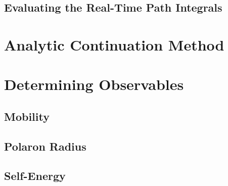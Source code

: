 \subsection{Evaluating the Real-Time Path Integrals}

\section{Analytic Continuation Method}

\section{Determining Observables}

\subsection{Mobility}

\subsection{Polaron Radius}

\subsection{Self-Energy}


